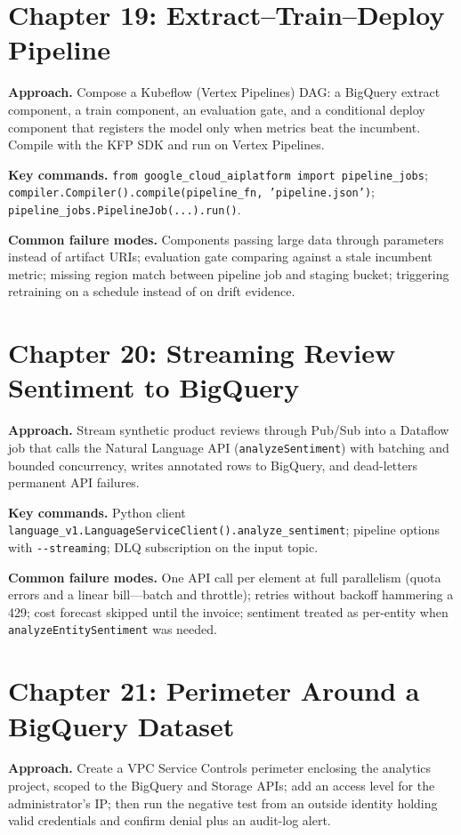 \section{Chapter 19: Extract--Train--Deploy Pipeline}
\textbf{Approach.} Compose a Kubeflow (Vertex Pipelines) DAG: a BigQuery extract component, a
train component, an evaluation gate, and a conditional deploy component that registers the model
only when metrics beat the incumbent. Compile with the KFP SDK and run on Vertex Pipelines.

\textbf{Key commands.} \texttt{from google\_cloud\_aiplatform import pipeline\_jobs};
\texttt{compiler.Compiler().compile(pipeline\_fn, 'pipeline.json')};
\texttt{pipeline\_jobs.PipelineJob(...).run()}.

\textbf{Common failure modes.} Components passing large data through parameters instead of
artifact URIs; evaluation gate comparing against a stale incumbent metric; missing region match
between pipeline job and staging bucket; triggering retraining on a schedule instead of on drift
evidence.

\section{Chapter 20: Streaming Review Sentiment to BigQuery}
\textbf{Approach.} Stream synthetic product reviews through Pub/Sub into a Dataflow job that calls
the Natural Language API (\texttt{analyzeSentiment}) with batching and bounded concurrency, writes
annotated rows to BigQuery, and dead-letters permanent API failures.

\textbf{Key commands.} Python client \texttt{language\_v1.LanguageServiceClient().analyze\_sentiment};
pipeline options with \texttt{-{}-streaming}; DLQ subscription on the input topic.

\textbf{Common failure modes.} One API call per element at full parallelism (quota errors and a
linear bill---batch and throttle); retries without backoff hammering a 429; cost forecast skipped
until the invoice; sentiment treated as per-entity when \texttt{analyzeEntitySentiment} was needed.

\section{Chapter 21: Perimeter Around a BigQuery Dataset}
\textbf{Approach.} Create a VPC Service Controls perimeter enclosing the analytics project, scoped
to the BigQuery and Storage APIs; add an access level for the administrator's IP; then run the
negative test from an outside identity holding valid credentials and confirm denial plus an
audit-log alert.

